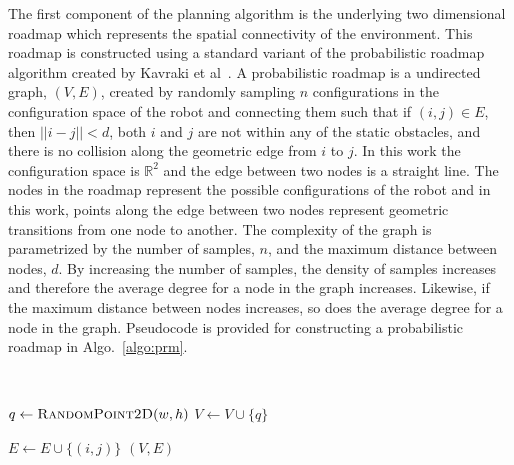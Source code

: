 The first component of the planning algorithm is the underlying two dimensional
roadmap which represents the spatial connectivity of the environment. This
roadmap is constructed using a standard variant of the probabilistic roadmap
algorithm created by Kavraki et al~\cite{prm}. A probabilistic roadmap is a
undirected graph, $(V, E)$, created by randomly sampling $n$ configurations in
the configuration space of the robot and connecting them such that if $(i, j)
\in E$, then $||i - j|| < d$, both $i$ and $j$ are not within any of the static
obstacles, and there is no collision along the geometric edge from $i$ to $j$.
In this work the configuration space is $\mathbb{R}^2$ and the edge between two
nodes is a straight line. The nodes in the roadmap represent the possible
configurations of the robot and in this work, points along the edge between two
nodes represent geometric transitions from one node to another. The complexity
of the graph is parametrized by the number of samples, $n$, and the maximum
distance between nodes, $d$. By increasing the number of samples, the density
of samples increases and therefore the average degree for a node in the graph
increases.  Likewise, if the maximum distance between nodes increases, so does
the average degree for a node in the graph.  Pseudocode is provided for
constructing a probabilistic roadmap in Algo.~\ref{algo:prm}.

\begin{algorithm}[ht]
    \caption{$\Function{Roadmap}(n, d, w, h, O)$}
    \\
    \label{algo:prm}
    \begin{algorithmic}[1]
        \setcounter{ALC@line}{0}
        \vspace*{1mm}

            \STATE $q \leftarrow \Function{RandomPoint2D}(w, h)$
                \STATE $V \leftarrow V \cup \{q\}$
            \ENDIF
        \ENDFOR

                    \STATE $E \leftarrow E \cup \{(i, j)\}$
                \ENDIF
            \ENDFOR
        \ENDFOR
        \RETURN $(V,E)$
    \end{algorithmic}
\end{algorithm}

